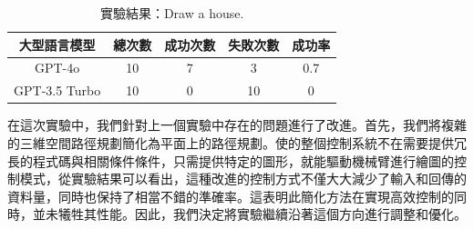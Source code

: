 \documentclass[class=NCU_thesis, crop=false]{standalone}
\begin{document}
\begin{table}[h]
    \centering
    \caption{實驗結果：Draw a house.}
    \begin{tabular}{ccccc}
    \hline
    大型語言模型 & 總次數 & 成功次數 & 失敗次數 & 成功率 \\
    \hline
    GPT-4o & 10 & 7 & 3 & 0.7\\
    \hline
    GPT-3.5 Turbo & 10 & 0 & 10 & 0\\
    \hline
    \end{tabular}
\end{table}
\newpage
在這次實驗中，我們針對上一個實驗中存在的問題進行了改進。首先，我們將複雜的三維空間路徑規劃簡化為平面上的路徑規劃。使的整個控制系統不在需要提供冗長的程式碼與相關條件條件，只需提供特定的圖形，就能驅動機械臂進行繪圖的控制模式，從實驗結果可以看出，這種改進的控制方式不僅大大減少了輸入和回傳的資料量，同時也保持了相當不錯的準確率。這表明此簡化方法在實現高效控制的同時，並未犧牲其性能。因此，我們決定將實驗繼續沿著這個方向進行調整和優化。
\end{document}
